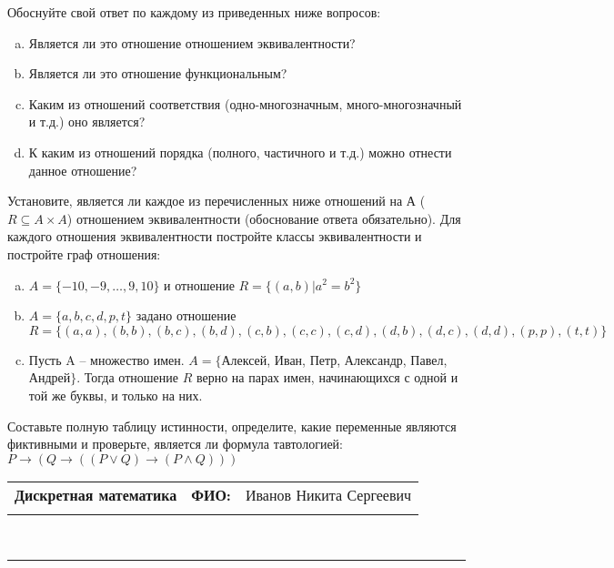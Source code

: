 \documentclass[10pt]{exam}
\newcommand{\class}{Дискретная математика}
\newcommand{\examdate}{}
\begin{document}
\begin{questions}
Обоснуйте свой ответ по каждому из приведенных ниже вопросов:
\begin{enumerate} [a)]\setcounter{enumi}{0}
    \item Является ли это отношение отношением эквивалентности?
    \item Является ли это отношение функциональным?
    \item Каким из отношений соответствия (одно-многозначным, много-многозначный и т.д.) оно является?
    \item К каким из отношений порядка (полного, частичного и т.д.) можно отнести данное отношение?
\end{enumerate}
\question
Установите, является ли каждое из перечисленных ниже отношений на А ($R \subseteq A \times A$) отношением эквивалентности (обоснование ответа обязательно). Для каждого отношения эквивалентности постройте классы 
эквивалентности и постройте граф отношения:
\begin{enumerate} [a)]\setcounter{enumi}{0}
\item $A = \{-10, -9, … , 9, 10\}$ и отношение $R = \{(a,b)|a^{2} = b^{2}\}$
\item $A = \{a, b, c, d, p, t\}$ задано отношение $R = \{(a, a), (b, b), (b, c), (b, d), (c, b), (c, c), (c, d), (d, b), (d, c), (d, d), (p,p), (t,t)\}$
\item Пусть A – множество имен. $A = \{ $Алексей, Иван, Петр, Александр, Павел, Андрей$ \}$. Тогда отношение $R$ верно на парах имен, начинающихся с одной и той же буквы, и только на них.
\end{enumerate}\question Составьте полную таблицу истинности, определите, какие переменные являются фиктивными и проверьте, является ли формула тавтологией:
$ P \rightarrow (Q \rightarrow ((P \lor Q) \rightarrow (P \land Q)))$

\end{questions}
\newpage
\begin{flushright}
\begin{tabular}{p{2.8in} r l}
\textbf{\class} & \textbf{ФИО:} &Иванов Никита Сергеевич
\\

\textbf{\examdate} &&\\
\end{tabular}\\
\end{flushright}
\rule[1ex]{\textwidth}{.1pt}
\end{document}
